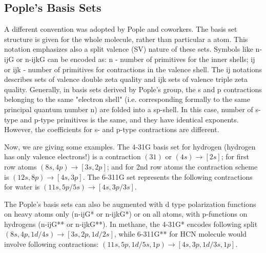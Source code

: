 \subsection{Pople's Basis Sets}
A different convention was adopted by Pople and coworkers. The basis
set structure is given for the whole molecule, rather than particular
a atom. This notation emphasizes also a split valence (SV) nature of
these sets. Symbols like n-ijG or n-ijkG can be encoded as: n - number
of primitives for the inner shells; ij or ijk - number of primitives
for contractions in the valence shell. The ij notations describes sets
of valence double zeta quality and ijk sets of valence triple zeta
quality. Generally, in basis sets derived by Pople's group, the s and
p contractions belonging to the same "electron shell"
(i.e. corresponding formally to the same principal quantum number n)
are folded into a sp-shell. In this case, number of s-type and p-type
primitives is the same, and they have identical exponents. However,
the coefficients for s- and p-type contractions are different.

Now, we are giving some examples. The 4-31G basis set for hydrogen
(hydrogen has only valence electrons!) is a contraction $(31)$ or
$(4s)\rightarrow[2s]$; for first row atoms $(8s,4p) \rightarrow
[3s,2p]$; and for 2nd row atoms the contraction scheme is $(12s,8p)
\rightarrow [4s,3p]$. The 6-311G set represents the following
contractions for water is $(11s,5p/5s) \rightarrow [4s,3p/3s]$.

The Pople's basis sets can also be augmented with d type polarization
functions on heavy atoms only (n-ijG* or n-ijkG*) or on all atoms,
with p-functions on hydrogens (n-ijG** or n-ijkG**). In methane, the
4-31G* encodes following split $(8s,4p,1d/4s) \rightarrow
[3s,2p,1d/2s]$, while 6-311G** for HCN molecule would involve
following contractions: $(11s,5p,1d/5s,1p) \rightarrow
[4s,3p,1d/3s,1p]$.




